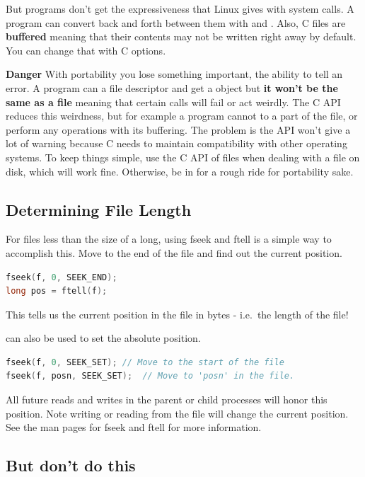 But programs don't get the expressiveness that Linux gives with system calls.
A program can convert back and forth between them with  and .
Also, C files are \textbf{buffered} meaning that their contents may not be written right away by default.
You can change that with C options.

\textbf{Danger} With portability you lose something important, the ability to tell an error.
A program can  a file descriptor and get a  object but \textbf{it won't be the same as a file} meaning that certain calls will fail or act weirdly.
The C API reduces this weirdness, but for example a program cannot  to a part of the file, or perform any operations with its buffering.
The problem is the API won't give a lot of warning because C needs to maintain compatibility with other operating systems.
To keep things simple, use the C API of files when dealing with a file on disk, which will work fine. Otherwise, be in for a rough ride for portability sake.

\subsection{Determining File Length}

For files less than the size of a long, using fseek and ftell is a
simple way to accomplish this.
Move to the end of the file and find out the current position.

\begin{lstlisting}[language=C]
fseek(f, 0, SEEK_END);
long pos = ftell(f);
\end{lstlisting}

This tells us the current position in the file in bytes - i.e.~the
length of the file!

 can also be used to set the absolute position.

\begin{lstlisting}[language=C]
fseek(f, 0, SEEK_SET); // Move to the start of the file
fseek(f, posn, SEEK_SET);  // Move to 'posn' in the file.
\end{lstlisting}

All future reads and writes in the parent or child processes will honor this position.
Note writing or reading from the file will change the current position.
See the man pages for fseek and ftell for more information.

\subsection{But don't do this}

